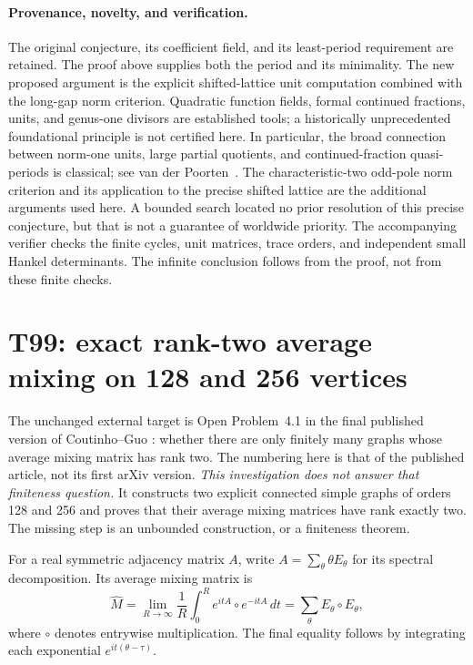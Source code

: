 \documentclass[11pt,a4paper]{article}
\theoremstyle{definition}
\theoremstyle{remark}
\begin{document}
\paragraph{Provenance, novelty, and verification.}
The original conjecture, its coefficient field, and its least-period
requirement are retained. The proof above supplies both the period and
its minimality. The new proposed argument is the explicit shifted-lattice
unit computation combined with the long-gap norm criterion. Quadratic
function fields, formal continued fractions, units, and genus-one
divisors are established tools; a historically unprecedented foundational
principle is not certified here. In particular, the broad connection
between norm-one units, large partial quotients, and continued-fraction
quasi-periods is classical; see van der Poorten~\cite[Sections 2--3]{t98vdp2001}.
The characteristic-two odd-pole norm criterion and its application to the
precise shifted lattice are the additional arguments used here.
A bounded search located no prior
resolution of this precise conjecture, but that is not a guarantee of
worldwide priority. The accompanying verifier checks the finite cycles,
unit matrices, trace orders, and independent small Hankel determinants.
The infinite conclusion follows from the proof, not from these finite
checks.

\clearpage
\section{T99: exact rank-two average mixing on 128 and 256 vertices}
\label{sec:t99}

The unchanged external target is Open Problem~4.1 in the final published
version of Coutinho--Guo \cite{t99cg2024}: whether there are only finitely
many graphs whose average mixing matrix has rank two. The numbering here
is that of the published article, not its first arXiv version.
\emph{This investigation does not answer that finiteness question.}
It constructs two explicit connected simple graphs of orders 128 and 256
and proves that their average mixing matrices have rank exactly two.
The missing step is an unbounded construction, or a finiteness theorem.

For a real symmetric adjacency matrix $A$, write
$A=\sum_\theta\theta E_\theta$ for its spectral decomposition. Its average
mixing matrix is
\[
 \widehat M=\lim_{R\to\infty}\frac1R\int_0^R
       e^{itA}\circ e^{-itA}\,dt
       =\sum_\theta E_\theta\circ E_\theta,
\]
where $\circ$ denotes entrywise multiplication. The final equality follows
by integrating each exponential $e^{it(\theta-\tau)}$.
\end{document}
